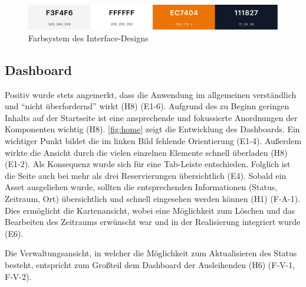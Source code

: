 \begin{figure}[h]
    \centering
    \includegraphics[scale=0.23]{Bilder/farben.png}
    \caption[Farbsystem des Interface-Designs]{Farbsystem des Interface-Designs}
    \label{fig:farben}
\end{figure}

\subsection{Dashboard}
Positiv wurde stets angemerkt, dass die Anwendung im allgemeinen verständlich
und \enquote{nicht überfordernd} wirkt (H8) (E1-6). Aufgrund des zu Beginn geringen
Inhalts auf der Startseite ist eine ansprechende und fokussierte Anordnungen der
Komponenten wichtig (H8). \ref{fig:home} zeigt die Entwicklung des Dashboards.
Ein wichtiger Punkt bildet die im linken Bild fehlende Orientierung (E1-4).
Außerdem wirkte die Ansicht durch die vielen einzelnen Elemente schnell
überladen (H8) (E1-2). Als Konsequenz wurde sich für eine Tab-Leiste entschieden.
Folglich ist die Seite auch bei mehr als drei Reservierungen übersichtlich (E4).
Sobald ein Asset ausgeliehen wurde, sollten die entsprechenden Informationen
(Status, Zeitraum, Ort) übersichtlich und schnell eingesehen werden können (H1)
(F-A-1). Dies ermöglicht die Kartenansicht, wobei eine Möglichkeit zum Löschen
und das Bearbeiten des Zeitraums erwünscht war und in der Realisierung
integriert wurde (E6).

Die Verwaltungsansicht, in welcher die Möglichkeit zum Aktualisieren des Status besteht, entspricht
zum Großteil dem Dashboard der Ausleihenden (H6) (F-V-1, F-V-2).

